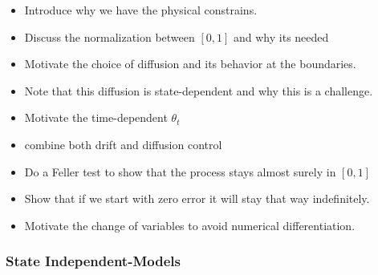 \documentclass[10pt,twocolumn,letterpaper]{article}
\begin{document}
\begin{itemize}
    \item Introduce why we have the physical constrains.
    \item Discuss the normalization between $[0,1]$ and why its needed
\end{itemize}



\begin{itemize}
    \item Motivate the choice of diffusion and its behavior at the boundaries.
    \item Note that this diffusion is state-dependent and why this is a challenge.
\end{itemize}


\begin{itemize}
    \item Motivate the time-dependent  $\theta_t$
\end{itemize}

\begin{itemize}
    \item combine both drift and diffusion control
    \item Do a Feller test to show that the process stays almost surely in $[0,1]$
    \item Show that if we start with zero error it will stay that way indefinitely.

\end{itemize}


\begin{itemize}
    \item Motivate the change of variables to avoid numerical differentiation.
\end{itemize}



\subsubsection{State Independent-Models}
\end{document}
